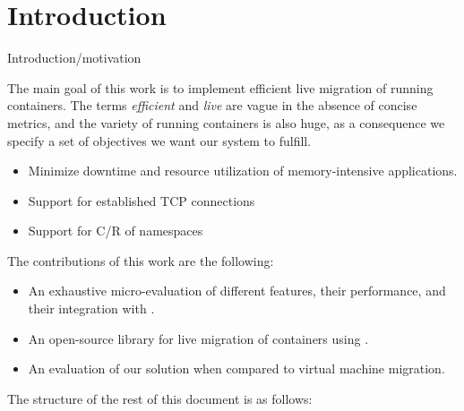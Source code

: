 \chapter{Introduction} \label{chap:introduction}


Introduction/motivation

The main goal of this work is to implement efficient live migration of running containers.
The terms \textit{efficient} and \textit{live} are vague in the absence of concise metrics, and the variety of running containers is also huge, as a consequence we specify a set of objectives we want our system to fulfill.
\begin{itemize}
    \item Minimize downtime and resource utilization of memory-intensive applications.
    \item Support for established TCP connections
    \item Support for C/R of namespaces
\end{itemize}

The contributions of this work are the following:
\begin{itemize}
    \item An exhaustive micro-evaluation of different \criu features, their performance, and their integration with \runc.
    \item An open-source library for live migration of \runc containers using \criu.
    \item An evaluation of our solution when compared to virtual machine migration.
\end{itemize}

The structure of the rest of this document is as follows:
